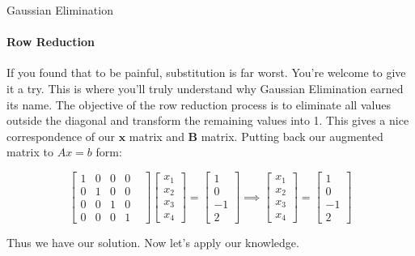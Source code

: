 \documentclass{beamer}
\begin{document}
\begin{frame}{Gaussian Elimination}
\framesubtitle{Row Reduction}
If you found that to be painful, substitution is far worst. You're welcome to give it a try. This is where you'll truly understand why Gaussian Elimination earned its name. The objective of the row reduction process is to eliminate all values outside the diagonal and transform the remaining values into 1. This gives a nice correspondence of our $\mathbf{x}$ matrix and $\mathbf{B}$ matrix. Putting back our augmented matrix to $Ax=b$ form:

\[
\begin{bmatrix}
    1 & 0 & 0 & 0 & \\
    0 & 1 & 0 & 0 & \\
    0 & 0 & 1 & 0 & \\
    0 & 0 & 0 & 1 & 
\end{bmatrix}
\begin{bmatrix}
    x_1 \\
    x_2 \\
    x_3 \\
    x_4
\end{bmatrix}
=
\begin{bmatrix}
    1 \\
    0 \\
    -1 \\
    2
\end{bmatrix}
\implies
\begin{bmatrix}
    x_1 \\
    x_2 \\
    x_3 \\
    x_4
\end{bmatrix}
=
\begin{bmatrix}
    1 \\
    0 \\
    -1 \\
    2
\end{bmatrix}
\]

Thus we have our solution. Now let's apply our knowledge.
\end{frame}
\end{document}

